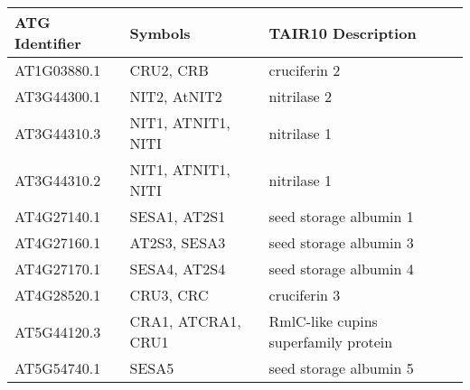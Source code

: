\begin{tabular}{@{}lll@{}}
\toprule
\textbf{ATG Identifier} & \textbf{Symbols}   & \textbf{TAIR10 Description}          \\ \midrule
AT1G03880.1             & CRU2, CRB          & cruciferin 2                         \\
AT3G44300.1             & NIT2, AtNIT2       & nitrilase 2                          \\
AT3G44310.3             & NIT1, ATNIT1, NITI & nitrilase 1                          \\
AT3G44310.2             & NIT1, ATNIT1, NITI & nitrilase 1                          \\
AT4G27140.1             & SESA1, AT2S1       & seed storage albumin 1               \\
AT4G27160.1             & AT2S3, SESA3       & seed storage albumin 3               \\
AT4G27170.1             & SESA4, AT2S4       & seed storage albumin 4               \\
AT4G28520.1             & CRU3, CRC          & cruciferin 3                         \\
AT5G44120.3             & CRA1, ATCRA1, CRU1 & RmlC-like cupins superfamily protein \\
AT5G54740.1             & SESA5              & seed storage albumin 5               \\ \bottomrule
\end{tabular}